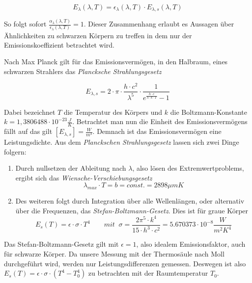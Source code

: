 \documentclass[a4paper, 11pt]{article}
\begin{document}
\begin{equation}
E_{\lambda}(\lambda,T)=\epsilon_{\lambda}(\lambda, T) \cdot E_{\lambda,s}(\lambda,T)
\end{equation}

So folgt sofort $\frac{\alpha_{\lambda}(\lambda, T)}{\epsilon_{\lambda}(\lambda, T)}=1$. Dieser Zusammenhang erlaubt es Aussagen über Ähnlichkeiten zu schwarzen Körpern zu treffen in dem nur der Emissionskoeffizient betrachtet wird.

Nach Max Planck gilt für das Emissionsvermögen, in den Halbraum, eines schwarzen Strahlers das \textit{Plancksche Strahlungsgesetz}

\begin{equation}
E_{\lambda,s}= 2 \cdot \pi \cdot \frac{h \cdot c^2}{\lambda^5} \cdot \frac{1}{e^{\frac{h\cdot c}{\lambda \cdot k \cdot T}}-1}
\end{equation}

Dabei bezeichnet $T$ die Temperatur des Körpers und $k$ die Boltzmann-Konstante $k=1,3806488 \cdot 10^{-23}\frac{J}{K}$. Betrachtet man nun die Einheit des Emissionsvermögens fällt auf das gilt $[E_{\lambda,s}]=\frac{W}{m^3}$. Demnach ist das Emissionsvermögen eine Leistungsdichte.
Aus dem \textit{Planckschen Strahlungsgesetz} lassen sich zwei Dinge folgern:

\begin{enumerate}
	\item Durch nullsetzen der Ableitung nach $\lambda$, also lösen des Extremwertproblems, ergibt sich das \textit{Wiensche-Verschiebungsgesetz}
	\begin{equation}
	\lambda_{max} \cdot T=b=const.=2898 \mu m K
	\end{equation}

	\item Des weiteren folgt durch Integration über alle Wellenlängen, oder alternativ über die Frequenzen, das \textit{Stefan-Boltzmann-Gesetz}. Dies ist für graue Körper
	\begin{equation}
	E_s(T)=\epsilon \cdot \sigma \cdot T^4
	\qquad 
	mit \;\; \sigma = \frac{2 \pi^5 \cdot k^4}{15 \cdot h^3 \cdot c^2}= 5.670373 \cdot 10^{-8} \frac{W}{m^2K^4}
	\end{equation}
\end{enumerate}

Das Stefan-Boltzmann-Gesetz gilt mit $\epsilon=1$, also idealem Emissionsfaktor, auch für schwarze Körper.
Da unsere Messung mit der Thermosäule nach Moll durchgeführt wird, werden nur Leistungsdifferenzen gemessen. Deswegen ist also $E_s(T)=\epsilon \cdot \sigma \cdot( T^4-T_0^4) $ zu betrachten mit der Raumtemperatur $T_0$.
\end{document}
